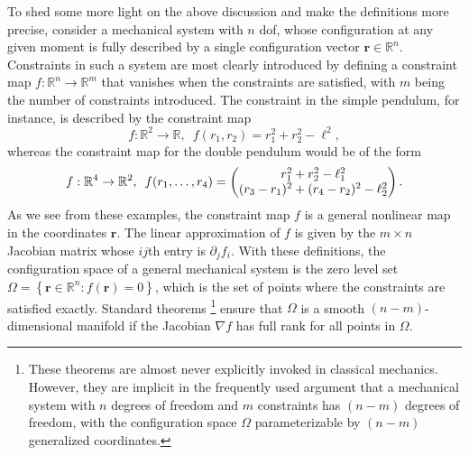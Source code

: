 To shed some more light on the above discussion and make the definitions more precise, consider a mechanical system with $n$ \ac{dof}, whose configuration at any given moment is fully described by a single configuration vector $\bm{r} \in \mathbb{R}^{n}$.
Constraints in such a system are most clearly introduced by defining a constraint map $f: \mathbb{R}^{n} \to \mathbb{R}^{m}$
that vanishes when the constraints are satisfied, with $m$ being the number of constraints introduced.
The constraint in the simple pendulum, for instance, is described by the constraint map
%
\begin{equation}
    f: \mathbb{R}^{2} \to \mathbb{R},\enspace f(r_{1}, r_{2}) = r_{1}^{2} + r_{2}^{2} - \ell^{2},
\end{equation}
%
whereas the constraint map for the double pendulum would be of the form
%
\begin{equation}
  \def\arraystretch{1}
  f: \mathbb{R}^{4} \to \mathbb{R}^{2},\enspace f(r_{1}, \ldots, r_{4}) =
\begin{pmatrix}
 r_{1}^{2} + r_{2}^{2} - \ell_{1}^{2}\\
 (r_{3} - r_{1})^{2} + (r_{4} - r_{2})^{2} - \ell_{2}^{2}
\end{pmatrix}.
\end{equation}
%
As we see from these examples, the constraint map $f$ is a general nonlinear map in the coordinates $\bm{r}$.
The linear approximation of $f$ is given by the $m\times n$ Jacobian matrix whose $i\!j$th entry is $\partial_{j}f_{i}$.
With these definitions, the configuration space of a general mechanical system is the zero level set $\Omega = \left\{\bm{r} \in \mathbb{R}^{n} : f(\bm{r}) = 0\right\}$, which is the set of points where the constraints are satisfied exactly.
Standard theorems%
\footnote{These theorems are almost never explicitly invoked in classical mechanics.
However, they are implicit in the frequently used argument that a mechanical system with $n$ degrees of freedom and $m$ constraints has $(n-m)$ degrees of freedom, with the configuration space $\Omega$ parameterizable by $(n-m)$ generalized coordinates.}
ensure that $\Omega$ is a smooth $(n-m)$-dimensional manifold if the Jacobian $\nabla f$ has full rank for all points in $\Omega$.

